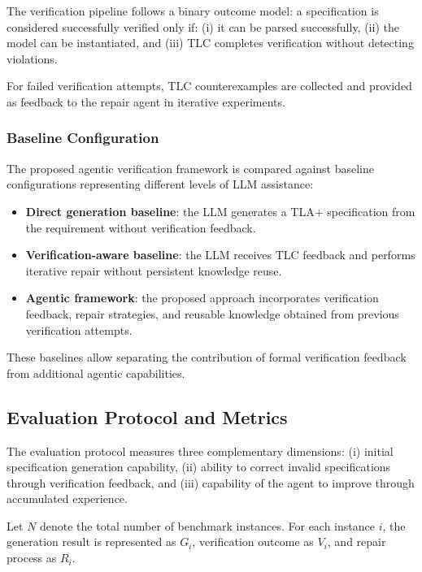 The verification pipeline follows a binary outcome model:
a specification is considered successfully verified only if:
(i) it can be parsed successfully,
(ii) the model can be instantiated,
and (iii) TLC completes verification without detecting violations.

For failed verification attempts, TLC counterexamples are collected and provided
as feedback to the repair agent in iterative experiments.

\subsubsection{Baseline Configuration}

The proposed agentic verification framework is compared against baseline
configurations representing different levels of LLM assistance:

\begin{itemize}
    \item \textbf{Direct generation baseline}: the LLM generates a TLA+
    specification from the requirement without verification feedback.
    
    \item \textbf{Verification-aware baseline}: the LLM receives TLC feedback
    and performs iterative repair without persistent knowledge reuse.
    
    \item \textbf{Agentic framework}: the proposed approach incorporates
    verification feedback, repair strategies, and reusable knowledge obtained
    from previous verification attempts.
\end{itemize}

These baselines allow separating the contribution of formal verification feedback
from additional agentic capabilities.

\subsection{Evaluation Protocol and Metrics}

The evaluation protocol measures three complementary dimensions:
(i) initial specification generation capability,
(ii) ability to correct invalid specifications through verification feedback,
and
(iii) capability of the agent to improve through accumulated experience.

Let $N$ denote the total number of benchmark instances. For each instance $i$,
the generation result is represented as $G_i$, verification outcome as $V_i$,
and repair process as $R_i$.


